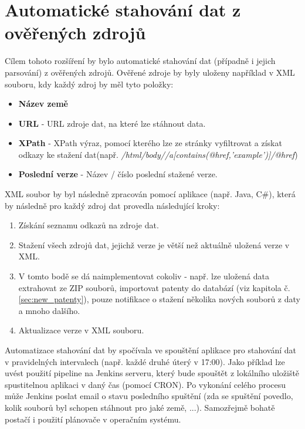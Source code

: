 \section{Automatické stahování dat z ověřených zdrojů}
Cílem tohoto rozšíření by bylo automatické stahování dat (případně i jejich parsování) z ověřených zdrojů. Ověřené zdroje by byly uloženy například v \gls{XML} souboru, kdy každý zdroj by měl tyto položky:
\begin{itemize}
\item \textbf{Název země}
\item \textbf{\gls{URL}} - \gls{URL} zdroje dat, na které lze stáhnout data.
\item \textbf{XPath} -  XPath výraz, pomocí kterého lze ze stránky vyfiltrovat a získat odkazy ke stažení dat\newline (např. \textit{/html/body//a[contains(@href,'example')]/@href})
\item \textbf{Poslední verze} - Název / číslo poslední stažené verze.
\end{itemize}
\gls{XML} soubor by byl následně zpracován pomocí aplikace (např. Java, C\#), která by následně pro každý zdroj dat provedla následující kroky:
\begin{enumerate}
\item Získání seznamu odkazů na zdroje dat.
\item Stažení všech zdrojů dat, jejichž verze je větší než aktuálně uložená verze v \gls{XML}.
\item V tomto bodě se dá naimplementovat cokoliv - např. lze uložená data extrahovat ze ZIP souborů, importovat patenty do databází (viz kapitola č. \ref{sec:new_patenty}), pouze notifikace o stažení několika nových souborů z daty a mnoho dalšího.
\item Aktualizace verze v \gls{XML} souboru.
\end{enumerate}
Automatizace stahování dat by spočívala ve spouštění aplikace pro stahování dat v pravidelných intervalech (např. každé druhé úterý v 17:00). Jako příklad lze uvést použití pipeline na Jenkins serveru, který bude spouštět z lokálního uložiště spustitelnou aplikaci v daný čas (pomocí CRON). Po vykonání celého procesu může Jenkins poslat email o stavu posledního spuštění (zda se spuštění povedlo, kolik souborů byl schopen stáhnout pro jaké země, ...). Samozřejmě bohatě postačí i použití plánovače v operačním systému.

